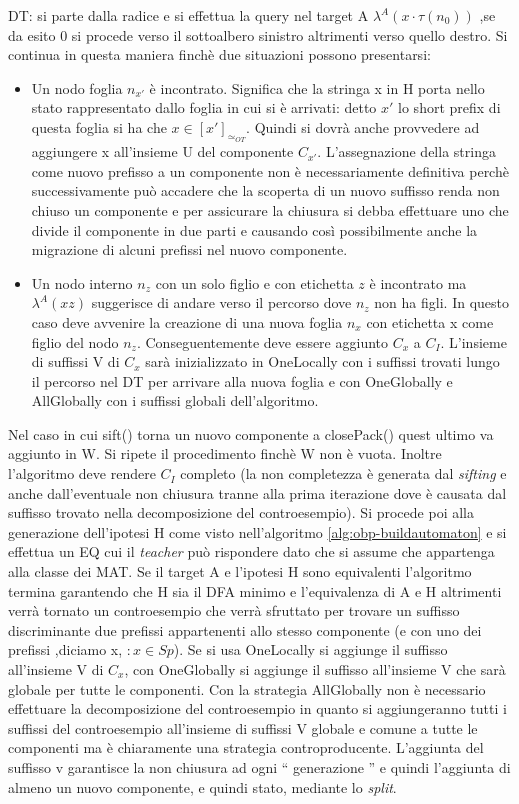 \ac{DT}: si parte dalla radice e si effettua la query nel target A $\lambda^{A}(x\cdot{}\tau(n_{0}))$ ,se da esito 0 si procede verso il sottoalbero sinistro altrimenti verso quello destro. Si continua in questa maniera finchè due situazioni possono presentarsi:
\begin{itemize}
\item Un nodo foglia $n_{x'}$ è incontrato. Significa che la stringa x in \ac{H} porta nello stato rappresentato dallo foglia in cui si è arrivati: detto $x'$ lo short prefix di questa foglia si ha che $x \in [x']_{\simeq_{OT}}$. Quindi si dovrà anche provvedere ad aggiungere x all'insieme U del componente $C_{x'}$. L'assegnazione della stringa come nuovo prefisso a un componente non è necessariamente definitiva perchè successivamente può accadere che la scoperta di un nuovo suffisso renda non chiuso un componente e per assicurare la chiusura si debba effettuare uno  che divide il componente in due parti e causando così possibilmente anche la migrazione di alcuni prefissi nel nuovo componente.
\item
Un nodo interno $n_{z}$ con un solo figlio e con etichetta $z$ è incontrato ma  $\lambda^{A}(xz)$ suggerisce di andare verso il percorso dove $n_{z}$ non ha figli. In questo caso deve avvenire la creazione di una nuova foglia $n_{x}$ con etichetta x come figlio del nodo $n_{z}$. Conseguentemente deve essere aggiunto $C_x$ a $C_I$. L'insieme di suffissi V di $C_x$ sarà inizializzato in OneLocally con i suffissi trovati lungo il percorso nel \ac{DT} per arrivare alla nuova foglia e con OneGlobally e AllGlobally  con i suffissi globali dell'algoritmo.\end{itemize}
Nel caso in cui  sift() torna un nuovo componente a closePack() quest ultimo va aggiunto in W. Si ripete il procedimento finchè W non è vuota. Inoltre l'algoritmo deve rendere $C_{I}$  completo (la non completezza è generata dal \textit{sifting} e anche dall'eventuale non chiusura tranne alla prima iterazione dove è causata dal suffisso trovato nella decomposizione del controesempio). Si procede poi alla generazione dell'ipotesi \ac{H} come visto nell'algoritmo \ref{alg:obp-buildautomaton} e si effettua un \ac{EQ} cui il \textit{teacher} può rispondere dato che si assume che appartenga alla classe dei \ac{MAT}. Se il target A e l'ipotesi \ac{H} sono equivalenti l'algoritmo termina garantendo che \ac{H} sia il DFA minimo e l'equivalenza di A e \ac{H} altrimenti verrà tornato un controesempio che verrà sfruttato per trovare un suffisso discriminante due prefissi appartenenti allo stesso componente (e con uno dei prefissi ,diciamo x, $: x \in Sp$). Se si usa OneLocally si aggiunge il suffisso all'insieme V di $C_{x}$, con OneGlobally si aggiunge il suffisso all'insieme V che sarà globale per tutte le componenti. Con la strategia AllGlobally non è necessario effettuare la decomposizione del controesempio in quanto si aggiungeranno tutti i suffissi del controesempio all'insieme di suffissi V globale e comune a tutte le componenti ma è chiaramente una strategia controproducente. L'aggiunta del suffisso v garantisce la non chiusura ad ogni  `` generazione  '' e quindi l'aggiunta di almeno un nuovo componente, e quindi stato, mediante lo \textit{split}.


